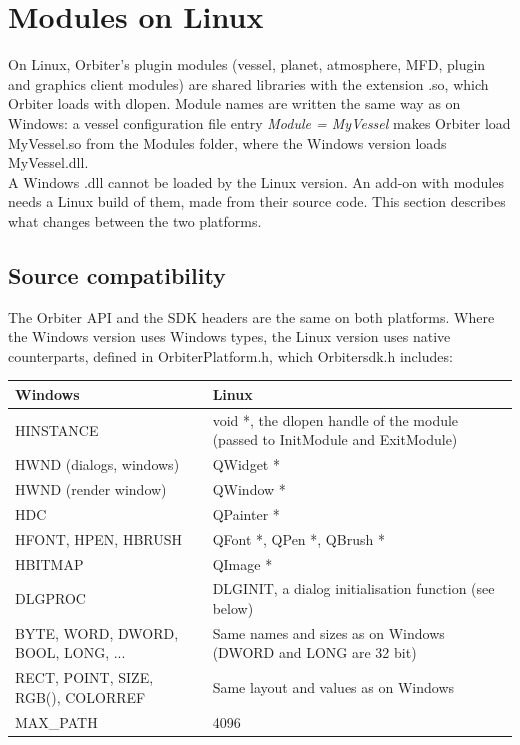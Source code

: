 \documentclass[Orbiter Developer Manual.tex]{subfiles}
\begin{document}
\section{Modules on Linux}
\label{sec:linux_modules}
On Linux, Orbiter's plugin modules (vessel, planet, atmosphere, MFD, plugin and graphics client modules) are shared libraries with the extension .so, which Orbiter loads with dlopen. Module names are written the same way as on Windows: a vessel configuration file entry \textit{Module = MyVessel} makes Orbiter load MyVessel.so from the Modules folder, where the Windows version loads MyVessel.dll.\\
A Windows .dll cannot be loaded by the Linux version. An add-on with modules needs a Linux build of them, made from their source code. This section describes what changes between the two platforms.


\subsection{Source compatibility}
The Orbiter API and the SDK headers are the same on both platforms. Where the Windows version uses Windows types, the Linux version uses native counterparts, defined in OrbiterPlatform.h, which Orbitersdk.h includes:

	\begin{longtable}{ |p{}|p{}| }
	\hline\rule{0pt}{2ex}
	\textbf{Windows} & \textbf{Linux}\\
	\hline\rule{0pt}{2ex}
	HINSTANCE & void *, the dlopen handle of the module (passed to InitModule and ExitModule)\\
	\hline\rule{0pt}{2ex}
	HWND (dialogs, windows) & QWidget *\\
	\hline\rule{0pt}{2ex}
	HWND (render window) & QWindow *\\
	\hline\rule{0pt}{2ex}
	HDC & QPainter *\\
	\hline\rule{0pt}{2ex}
	HFONT, HPEN, HBRUSH & QFont *, QPen *, QBrush *\\
	\hline\rule{0pt}{2ex}
	HBITMAP & QImage *\\
	\hline\rule{0pt}{2ex}
	DLGPROC & DLGINIT, a dialog initialisation function (see below)\\
	\hline\rule{0pt}{2ex}
	BYTE, WORD, DWORD, BOOL, LONG, ... & Same names and sizes as on Windows (DWORD and LONG are 32 bit)\\
	\hline\rule{0pt}{2ex}
	RECT, POINT, SIZE, RGB(), COLORREF & Same layout and values as on Windows\\
	\hline\rule{0pt}{2ex}
	MAX\_PATH & 4096\\
	\hline
	\end{longtable}
\end{document}
